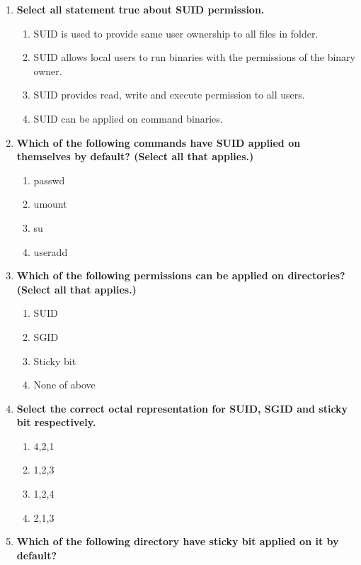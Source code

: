 \begin{flushleft}
\begin{enumerate}
		\item \textbf{Select all statement true about SUID permission.}
		\begin{enumerate}[label=(\alph*)]
			\item SUID is used to provide same user ownership to all files in folder.
			\item SUID allows local users to run binaries with the permissions of the binary owner. %
			\item SUID provides read, write and execute permission to all users.
			\item SUID can be applied on command binaries. %
		\end{enumerate}
		\bigskip
		\bigskip
		\item \textbf{Which of the following commands have SUID applied on themselves by default? (Select all that applies.)}
		\begin{enumerate}[label=(\alph*)]
			\item passwd    %
			\item umount    %
			\item su       %
			\item useradd
		\end{enumerate}
		\bigskip
		\bigskip
		\item \textbf{Which of the following permissions can be applied on directories? (Select all that applies.)}
		\begin{enumerate}[label=(\alph*)]
			\item SUID
			\item SGID                 %
			\item Sticky bit          %
			\item None of above
		\end{enumerate}	
		\bigskip
		\bigskip
		\item \textbf{Select the correct octal representation for SUID, SGID and sticky bit respectively.}
		\begin{enumerate}[label=(\alph*)]
			\item 4,2,1    %
			\item 1,2,3
			\item 1,2,4
			\item 2,1,3
		\end{enumerate}
		\bigskip
		\bigskip
		\item \textbf{Which of the following directory have sticky bit applied on it by default?}
		\begin{enumerate}[label=(\alph*)]

\end{enumerate}
\end{enumerate}
\end{flushleft}
